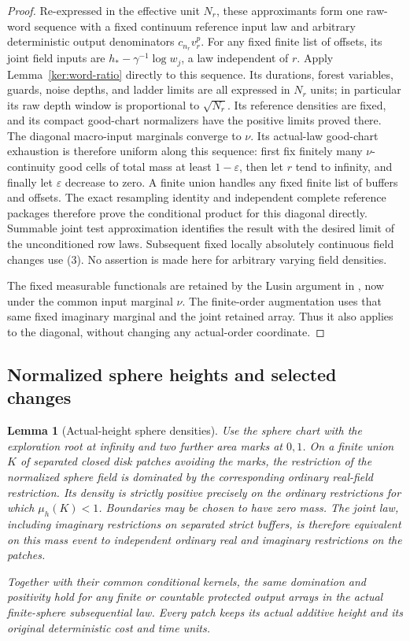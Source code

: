 \documentclass[11pt]{article}
\numberwithin{equation}{section}
\newtheorem{lemma}[theorem]{Lemma}
\theoremstyle{definition}
\theoremstyle{remark}
\newcommand{\1}{\mathbf 1}
\begin{document}
\begin{proof}
Re-expressed in the effective unit \(N_r\), these approximants form
one raw-word sequence with a fixed continuum reference input law and
arbitrary deterministic output denominators \(c_{n_r}v_r^p\).
For any fixed finite list of offsets, its joint field inputs are
\(h_*-\gamma^{-1}\log w_j\), a law independent of \(r\).
Apply Lemma~\ref{ker:word-ratio} directly to this sequence.
Its durations, forest variables, guards, noise depths, and ladder
limits are all expressed in \(N_r\) units; in particular its raw
depth window is proportional to \(\sqrt{N_r}\).  Its reference densities are
fixed, and its compact good-chart normalizers have the positive
limits proved there.  The diagonal macro-input marginals converge
to \(\nu\).  Its actual-law good-chart exhaustion is therefore
uniform along this sequence: first fix finitely many
\(\nu\)-continuity good cells of total mass at least
\(1-\varepsilon\), then let \(r\) tend to infinity, and
finally let \(\varepsilon\) decrease to zero.  A finite union handles
any fixed finite list of buffers and offsets.  The exact resampling
identity and independent complete reference packages therefore prove
the conditional product for this diagonal directly.  Summable joint
test approximation identifies the result with the desired limit of
the unconditioned row laws.  Subsequent fixed locally absolutely
continuous field changes use (3).  No assertion is
made here for arbitrary varying field densities.

The fixed measurable functionals are retained by the Lusin argument
in , now under the common input marginal
\(\nu\). The finite-order augmentation uses that same fixed imaginary
marginal and the joint retained array. Thus it also applies to the
diagonal, without changing any actual-order coordinate.
\end{proof}

\subsection{Normalized sphere heights and selected changes}

\begin{lemma}[Actual-height sphere densities]\label{ker:sphere-density}
Use the sphere chart with the exploration root at infinity and two
further area marks at \(0,1\).  On a finite union \(K\) of separated
closed disk patches avoiding the marks, the restriction of the
normalized sphere field is dominated by the corresponding ordinary
real-field restriction.  Its density is strictly positive precisely
on the ordinary restrictions for which
\(\mu_h(K)<1\).  Boundaries may be chosen to have zero mass.
The joint law, including imaginary restrictions on separated strict
buffers, is therefore equivalent on this mass event to independent
ordinary real and imaginary restrictions on the patches.

Together with their common conditional kernels, the same domination
and positivity hold for any finite or countable protected output
arrays in the actual finite-sphere subsequential law.  Every patch
keeps its actual additive height and its original deterministic cost
and time units.
\end{lemma}
\end{document}

